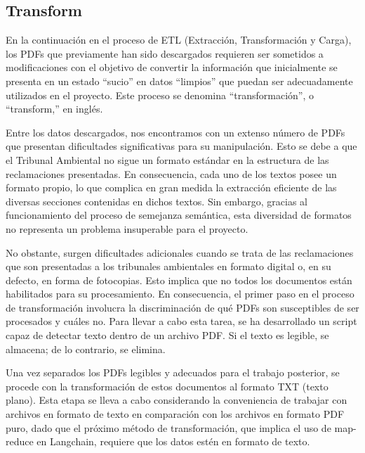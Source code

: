 \subsection{Transform}

\par En la continuación en el proceso de ETL (Extracción, Transformación y Carga), los PDFs que previamente han sido descargados 
requieren ser sometidos a modificaciones con el objetivo de convertir la información que inicialmente se presenta en un 
estado ``sucio'' en datos ``limpios'' que puedan ser adecuadamente utilizados en el proyecto. Este proceso se denomina 
``transformación'', o ``transform,'' en inglés.

\par Entre los datos descargados, nos encontramos con un extenso número de PDFs que presentan dificultades significativas para su 
manipulación. Esto se debe a que el Tribunal Ambiental no sigue un formato estándar en la estructura de las reclamaciones 
presentadas. En consecuencia, cada uno de los textos posee un formato propio, lo que complica en gran medida la extracción 
eficiente de las diversas secciones contenidas en dichos textos. Sin embargo, gracias al funcionamiento del proceso de semejanza 
semántica, esta diversidad de formatos no representa un problema insuperable para el proyecto.

\par No obstante, surgen dificultades adicionales cuando se trata de las reclamaciones que son presentadas a los tribunales ambientales 
en formato digital o, en su defecto, en forma de fotocopias. Esto implica que no todos los documentos están habilitados para su 
procesamiento. En consecuencia, el primer paso en el proceso de transformación involucra la discriminación de qué PDFs son 
susceptibles de ser procesados y cuáles no. Para llevar a cabo esta tarea, se ha desarrollado un script capaz de detectar 
texto dentro de un archivo PDF. Si el texto es legible, se almacena; de lo contrario, se elimina.

\par Una vez separados los PDFs legibles y adecuados para el trabajo posterior, se procede con la transformación de estos documentos 
al formato TXT (texto plano). Esta etapa se lleva a cabo considerando la conveniencia de trabajar con archivos en formato de 
texto en comparación con los archivos en formato PDF puro, dado que el próximo método de transformación, que implica el uso de
 map-reduce en Langchain, requiere que los datos estén en formato de texto.

